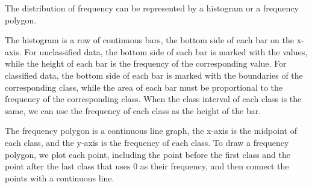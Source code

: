 \documentclass{report}
\begin{document}
\begin{multicols}{2}
  The distribution of frequency can be represented by a histogram or a frequency
  polygon.

  The histogram is a row of continuous bars, the bottom side of each bar on the
  x-axis. For unclassified data, the bottom side of each bar is marked with the
  values, while the height of each bar is the frequency of the corresponding
  value. For classified data, the bottom side of each bar is marked with the
  boundaries of the corresponding class, while the area of each bar must be
  proportional to the frequency of the corresponding class. When the class
  interval of each class is the same, we can use the frequency of each class as
  the height of the bar.
  \begin{center}
  \end{center}

  The frequency polygon is a continuous line graph, the x-axis is the midpoint of
  each class, and the y-axis is the frequency of each class. To draw a frequency
  polygon, we plot each point, including the point before the first class and the
  point after the last class that uses $0$ as their frequency, and then connect
  the points with a continuous line.

  \begin{center}
  \end{center}


\end{multicols}
\end{document}

